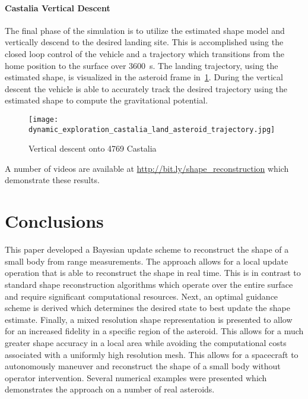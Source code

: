 \documentclass[smallextended]{svjour3}       %
\newcommand{\todo}[1]{\vspace{5 mm}\par \noindent
\marginpar{\textsc{ToDo}} \framebox{\begin{minipage}[c]{0.95
\textwidth} \tt #1 \end{minipage}}\vspace{5 mm}\par}
\begin{document}
\paragraph{Castalia Vertical Descent}

The final phase of the simulation is to utilize the estimated shape model and vertically descend to the desired landing site. 
This is accomplished using the closed loop control of the vehicle and a trajectory which transitions from the home position to the surface over \SI{3600}{\second}.
The landing trajectory, using the estimated shape, is visualized in the asteroid frame in~\cref{fig:castalia_landing}.
During the vertical descent the vehicle is able to accurately track the desired trajectory using the estimated shape to compute the gravitational potential.
\begin{figure}[htbp]
    \centering
    \texttt{[image: dynamic\_exploration\_castalia\_land\_asteroid\_trajectory.jpg]}
    \caption{Vertical descent onto 4769 Castalia~\label{fig:castalia_landing}}
\end{figure}
A number of videos are available at \url{http://bit.ly/shape_reconstruction} which demonstrate these results.

\section{Conclusions}

This paper developed a Bayesian update scheme to reconstruct the shape of a small body from range measurements. 
The approach allows for a local update operation that is able to reconstruct the shape in real time. 
This is in contrast to standard shape reconstruction algorithms which operate over the entire surface and require significant computational resources.
Next, an optimal guidance scheme is derived which determines the desired state to best update the shape estimate. 
Finally, a mixed resolution shape representation is presented to allow for an increased fidelity in a specific region of the asteroid.
This allows for a much greater shape accuracy in a local area while avoiding the computational costs associated with a uniformly high resolution mesh.
This allows for a spacecraft to autonomously maneuver and reconstruct the shape of a small body without operator intervention.
Several numerical examples were presented which demonstrates the approach on a number of real asteroids.
\end{document}
